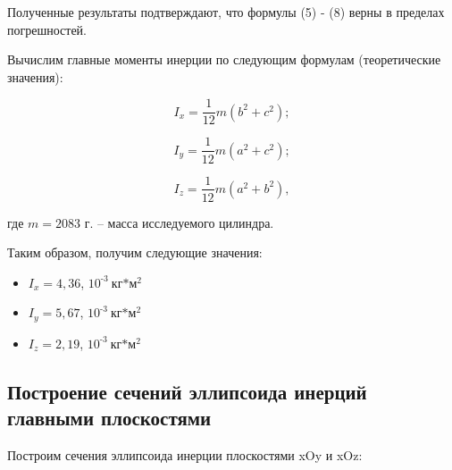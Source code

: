 Полученные результаты подтверждают, что формулы (5) - (8) верны в пределах погрешностей.

Вычислим главные моменты инерции по следующим формулам (теоретические значения):

\begin{equation}
    I_x = \frac{1}{12} m (b^2 + c^2);
\end{equation}

\begin{equation}
    I_y = \frac{1}{12} m (a^2 + c^2);
\end{equation}

\begin{equation}
    I_z = \frac{1}{12} m (a^2 + b^2),
\end{equation}

где $m = 2083$ г. -- масса исследуемого цилиндра.

Таким образом, получим следующие значения:

\begin{itemize}
    \item $I_x = 4,36$, $10^\text{-3} \ $кг$*$м$^2$
    \item $I_y = 5,67$, $10^\text{-3} \ $кг$*$м$^2$
    \item $I_z = 2,19$, $10^\text{-3} \ $кг$*$м$^2$
\end{itemize}

\subsection{Построение сечений эллипсоида инерций главными плоскостями}

Построим сечения эллипсоида инерции плоскостями xOy и xOz:

